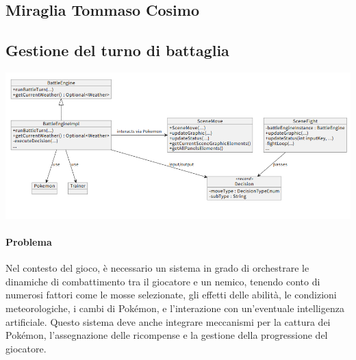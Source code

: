 \documentclass[a4paper,12pt]{report}
\begin{document}
{{\subsection{Miraglia Tommaso Cosimo}
\subsection*{Gestione del turno di battaglia}
\includegraphics[width=\textwidth]{immagini/battleEngineUML.png}
\paragraph{Problema}
Nel contesto del gioco, è necessario un sistema in grado di orchestrare le dinamiche di combattimento tra il giocatore e un nemico, tenendo conto di numerosi fattori come le mosse selezionate, gli effetti delle abilità, le condizioni meteorologiche, i cambi di Pokémon, e l’interazione con un’eventuale intelligenza artificiale. Questo sistema deve anche integrare meccanismi per la cattura dei Pokémon, l’assegnazione delle ricompense e la gestione della progressione del giocatore.

}}
\end{document}

